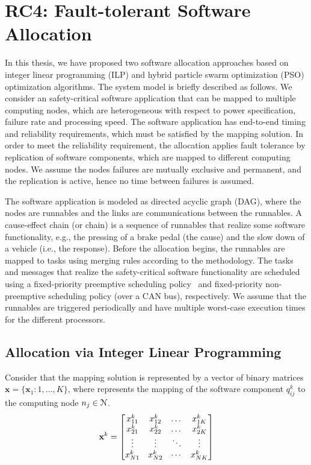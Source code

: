 \section{RC4: Fault-tolerant Software Allocation}\label{rc_ilp}
In this thesis, we have proposed two software allocation approaches based on integer linear programming (ILP) and hybrid  particle swarm optimization (PSO) optimization algorithms. The system model is briefly described as follows. We consider an \autosar{} safety-critical software application that can be mapped to multiple computing nodes, which are heterogeneous with respect to power specification, failure rate and processing speed. The software application has end-to-end timing and reliability requirements, which must be satisfied by the mapping solution. In order to meet the reliability requirement, the allocation applies fault tolerance by replication of software components, which are mapped to different computing nodes. We assume the nodes failures are mutually exclusive and permanent, and the replication is active, hence no time between failures is assumed.

The software application is modeled as directed acyclic graph (DAG), where the nodes are runnables and the links are communications between the runnables. A cause-effect chain (or chain) is a sequence of runnables that realize some software functionality, e.g., the pressing of a brake pedal (the cause) and the slow down of a vehicle (i.e., the response). Before the allocation begins, the runnables are mapped to tasks using merging rules according to the \autosar{} methodology. The tasks and messages that realize the safety-critical software functionality are scheduled using a fixed-priority preemptive scheduling policy~\cite{Sha2004RealPerspective} and fixed-priority non-preemptive scheduling policy (over a  CAN bus), respectively. We assume that the runnables are triggered periodically and have multiple worst-case execution times for the different processors.

\subsection*{Allocation via Integer Linear Programming}
Consider that the mapping solution is represented by a vector of binary matrices $\textbf{x}=\{\textbf{x}_1:1,...,K\}$, where \ttxkij{} represents the mapping of the software component $q^{k}_{ij}$ to the computing node $\ssb{n}[j]\in \mathcal{N}$. 
\begin{equation}
\label{eqn_solution}
\bspx{k}=
\begin{bmatrix} 
\ssx{k}{11} & \ssx{k}{12} & \dots & \ssx{k}{1K}\\
\ssx{k}{21} & \ssx{k}{22} & \dots & \ssx{k}{2K}\\
\vdots & \vdots & \ddots & \vdots\\
\ssx{k}{N1} & \ssx{k}{N2} & \cdots & \ssx{k}{NK}
\end{bmatrix}
\end{equation}

